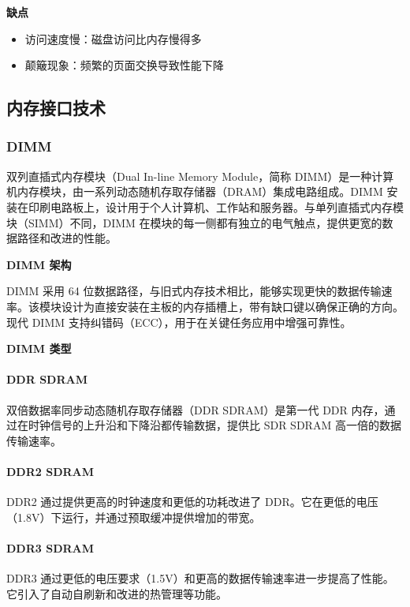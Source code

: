 \documentclass{article}
\begin{document}
\textbf{缺点}
\begin{itemize}
    \item 访问速度慢：磁盘访问比内存慢得多
    \item 颠簸现象：频繁的页面交换导致性能下降
\end{itemize}

\subsection{内存接口技术}

\subsubsection{DIMM}

双列直插式内存模块（Dual In-line Memory Module，简称 DIMM）是一种计算机内存模块，由一系列动态随机存取存储器（DRAM）集成电路组成。DIMM 安装在印刷电路板上，设计用于个人计算机、工作站和服务器。与单列直插式内存模块（SIMM）不同，DIMM 在模块的每一侧都有独立的电气触点，提供更宽的数据路径和改进的性能。

\textbf{DIMM 架构}

DIMM 采用 64 位数据路径，与旧式内存技术相比，能够实现更快的数据传输速率。该模块设计为直接安装在主板的内存插槽上，带有缺口键以确保正确的方向。现代 DIMM 支持纠错码（ECC），用于在关键任务应用中增强可靠性。

\textbf{DIMM 类型}

\paragraph{DDR SDRAM}

双倍数据率同步动态随机存取存储器（DDR SDRAM）是第一代 DDR 内存，通过在时钟信号的上升沿和下降沿都传输数据，提供比 SDR SDRAM 高一倍的数据传输速率。

\paragraph{DDR2 SDRAM}

DDR2 通过提供更高的时钟速度和更低的功耗改进了 DDR。它在更低的电压（1.8V）下运行，并通过预取缓冲提供增加的带宽。

\paragraph{DDR3 SDRAM}

DDR3 通过更低的电压要求（1.5V）和更高的数据传输速率进一步提高了性能。它引入了自动自刷新和改进的热管理等功能。
\end{document}
